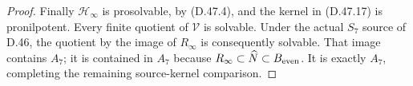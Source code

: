 \begin{proof}
Finally
\(\mathcal H_\infty\)
is prosolvable,
by (D.47.4),
and the kernel
in (D.47.17)
is pronilpotent.
Every finite
quotient of
\(\mathcal V\)
is solvable.
Under the actual
\(S_7\) source
of D.46, the
quotient by the
image of
\(R_\infty\)
is consequently
solvable.
That image contains
\(A_7\); it is
contained in
\(A_7\) because
\(R_\infty\subset
\widehat N\subset
B_{\rm even}\).
It is exactly
\(A_7\), completing
the remaining
source-kernel
comparison.
\end{proof}
